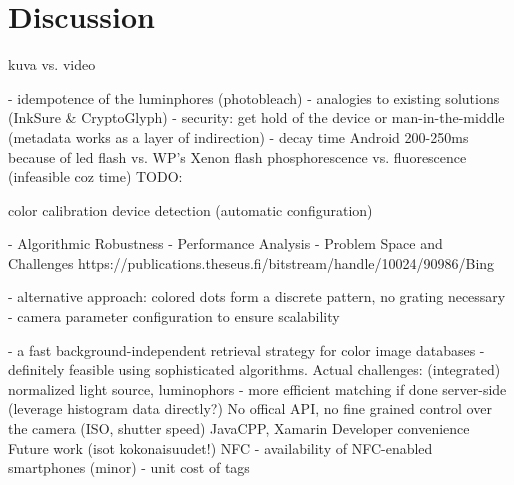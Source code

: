 \documentclass[thesis.tex]{subfiles}
\begin{document}
\chapter{Discussion}
\label{chapter:discussion}
kuva vs. video

- idempotence of the luminphores (photobleach)
- analogies to existing solutions (InkSure \& CryptoGlyph)
- security: get hold of the device or man-in-the-middle (metadata works as a layer of indirection)
- decay time Android 200-250ms because of led flash vs. WP's Xenon flash
phosphorescence vs. fluorescence (infeasible coz time)
TODO:

color calibration
device detection (automatic configuration)

- Algorithmic Robustness
- Performance Analysis
- Problem Space and Challenges
https://publications.theseus.fi/bitstream/handle/10024/90986/Bing%




- alternative approach: colored dots form a discrete pattern, no grating necessary
- camera parameter configuration to ensure scalability

- a fast background-independent retrieval strategy for color image databases
- definitely feasible using sophisticated algorithms. Actual challenges: (integrated) normalized light source, luminophors
- more efficient matching if done server-side (leverage histogram data directly?)
No offical API, no fine grained control over the camera (ISO, shutter speed)
JavaCPP, Xamarin
Developer convenience
Future work (isot kokonaisuudet!)
NFC
- availability of NFC-enabled smartphones (minor)
- unit cost of tags
\end{document}
